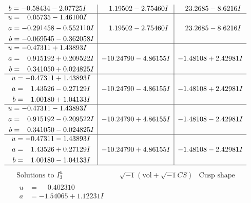 \documentclass[1p]{elsarticle_modified}
\theoremstyle{definition}
\newcommand{\I}{\sqrt{-1}}
\begin{document}
$$\begin{array}{c|c|c}
\begin{aligned}
b &= -0.58434 - 2.07725 I\end{aligned}
 & \phantom{-}1.19502 - 2.75460 I & \phantom{-}23.2685 - 8.6216 I \\ \hline\begin{aligned}
u &= \phantom{-}0.05735 - 1.46100 I \\
a &= -0.291458 - 0.552110 I \\
b &= -0.069545 - 0.362058 I\end{aligned}
 & \phantom{-}1.19502 - 2.75460 I & \phantom{-}23.2685 - 8.6216 I \\ \hline\begin{aligned}
u &= -0.47311 + 1.43893 I \\
a &= \phantom{-}0.915192 + 0.209522 I \\
b &= \phantom{-}0.341050 + 0.024825 I\end{aligned}
 & -10.24790 - 4.86155 I & -1.48108 + 2.42981 I \\ \hline\begin{aligned}
u &= -0.47311 + 1.43893 I \\
a &= \phantom{-}1.43526 - 0.27129 I \\
b &= \phantom{-}1.00180 + 1.04133 I\end{aligned}
 & -10.24790 - 4.86155 I & -1.48108 + 2.42981 I \\ \hline\begin{aligned}
u &= -0.47311 - 1.43893 I \\
a &= \phantom{-}0.915192 - 0.209522 I \\
b &= \phantom{-}0.341050 - 0.024825 I\end{aligned}
 & -10.24790 + 4.86155 I & -1.48108 - 2.42981 I \\ \hline\begin{aligned}
u &= -0.47311 - 1.43893 I \\
a &= \phantom{-}1.43526 + 0.27129 I \\
b &= \phantom{-}1.00180 - 1.04133 I\end{aligned}
 & -10.24790 + 4.86155 I & -1.48108 - 2.42981 I\\
 \hline 
 \end{array}$$\newpage$$\begin{array}{c|c|c}  
\text{Solutions to }I^u_{3}& \I (\text{vol} + \sqrt{-1}CS) & \text{Cusp shape}\\
 \hline 
\begin{aligned}
u &= \phantom{-}0.402310\phantom{ +0.000000I} \\
a &= -1.54065 + 1.12231 I \\

\end{aligned}
\end{array}$$
\end{document}
